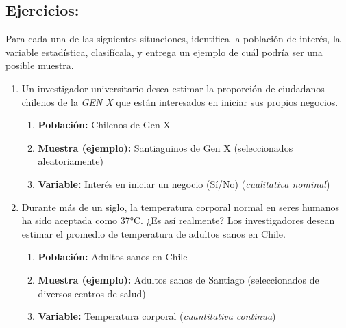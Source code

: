 \documentclass[12pt, letterpaper]{article}
\begin{document}
\subsection{Ejercicios:}
Para cada una de las siguientes situaciones, identifica la población de interés, la variable estadística, clasifícala, y entrega un ejemplo de cuál podría ser una posible muestra.

\begin{enumerate}
    \item Un investigador universitario desea estimar la proporción de ciudadanos chilenos de la \textit{GEN X} que están interesados en iniciar sus propios negocios.
        \begin{enumerate}
            \item \textbf{Población:} Chilenos de Gen X
            \item \textbf{Muestra (ejemplo):} Santiaguinos de Gen X (seleccionados aleatoriamente)
            \item \textbf{Variable:} Interés en iniciar un negocio (Sí/No) (\textit{cualitativa nominal})
        \end{enumerate}

    \item Durante más de un siglo, la temperatura corporal normal en seres humanos ha sido aceptada como 37°C. ¿Es así realmente? Los investigadores desean estimar el promedio de temperatura de adultos sanos en Chile.
        \begin{enumerate}
            \item \textbf{Población:} Adultos sanos en Chile
            \item \textbf{Muestra (ejemplo):} Adultos sanos de Santiago (seleccionados de diversos centros de salud)
            \item \textbf{Variable:} Temperatura corporal (\textit{cuantitativa continua})
        \end{enumerate}


\end{enumerate}
\end{document}
